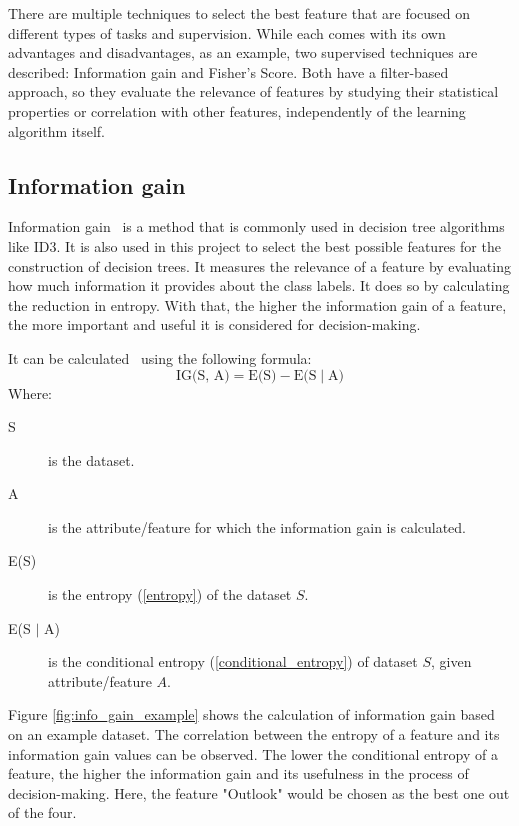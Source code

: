 There are multiple techniques to select the best feature that are focused on different types of tasks and supervision. While each comes with its own advantages and disadvantages, as an example, two supervised techniques are described: Information gain and Fisher's Score. Both have a filter-based approach, so they evaluate the relevance of features by studying their statistical properties or correlation with other features, independently of the learning algorithm itself.

\subsection{Information gain} \label{information_gain}
Information gain~\cite{feature_selection} is a method that is commonly used in decision tree algorithms like ID3. It is also used in this project to select the best possible features for the construction of decision trees. It measures the relevance of a feature by evaluating how much information it provides about the class labels. It does so by calculating the reduction in entropy. With that, the higher the information gain of a feature, the more important and useful it is considered for decision-making.

It can be calculated~\cite{information_gain_wiki} using the following formula:
\[ \text{IG(S, A)} = \text{E(S)} - \text{E(S}\mid \text{A)}\]
Where:
\begin{description}
	\item[S] is the dataset.
	\item[A] is the attribute/feature for which the information gain is calculated.
    \item[E(S)] is the entropy (\ref{entropy}) of the dataset $S$.
    \item[E(S $\mid$ A)] is the conditional entropy (\ref{conditional_entropy}) of dataset $S$, given attribute/feature $A$.
\end{description}

Figure \ref{fig:info_gain_example} shows the calculation of information gain based on an example dataset.
The correlation between the entropy of a feature and its information gain values can be observed. The lower the conditional entropy of a feature, the higher the information gain and its usefulness in the process of decision-making. Here, the feature "Outlook" would be chosen as the best one out of the four.

